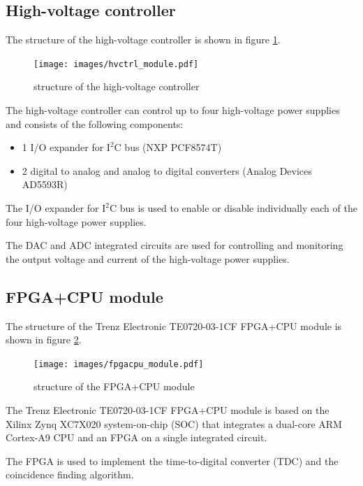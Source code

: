 \documentclass[12pt, a4paper]{article}
\begin{document}
\subsection{High-voltage controller}

The structure of the high-voltage controller is shown in figure \ref{fig:hvctrl_module}.

\begin{figure}[h!]
  \centering
  \texttt{[image: images/hvctrl\_module.pdf]}
  \caption{structure of the high-voltage controller}
  \label{fig:hvctrl_module}
\end{figure}

The high-voltage controller can control up to four high-voltage power supplies and consists of the following components:
\begin{itemize}[nosep]
  \item 1 I/O expander for $\text{I}^\text{2}\text{C}$ bus (NXP PCF8574T) \cite{pcf8574t}
  \item 2 digital to analog and analog to digital converters (Analog Devices AD5593R) \cite{ad5593r}
\end{itemize}

The I/O expander for $\text{I}^\text{2}\text{C}$ bus is used to enable or disable individually each of the four high-voltage power supplies.

The DAC and ADC integrated circuits are used for controlling and monitoring the output voltage and current of the high-voltage power supplies.

\subsection{FPGA+CPU module}

The structure of the Trenz Electronic TE0720-03-1CF FPGA+CPU module is shown in figure \ref{fig:fpgacpu_module}.

\begin{figure}[h!]
  \centering
  \texttt{[image: images/fpgacpu\_module.pdf]}
  \caption{structure of the FPGA+CPU module}
  \label{fig:fpgacpu_module}
\end{figure}

The Trenz Electronic TE0720-03-1CF FPGA+CPU module is based on the Xilinx Zynq XC7X020 system-on-chip (SOC) that integrates a dual-core ARM Cortex-A9 CPU and an FPGA on a single integrated circuit.

The FPGA is used to implement the time-to-digital converter (TDC) and the coincidence finding algorithm.
\end{document}
